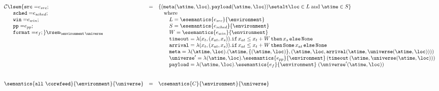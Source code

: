 
\newcommand{\rb}[1]{\raisebox{6ex}[0pt]{#1}}

\begin{figure*}[t]
\[
\begin{array}{lcl}

    {\cal C}\lsem\mathtt{\{ src=} e_{src}; 
 &=& \{( \mathtt{meta} (\atime,\loc), \mathtt{payload} (\atime,\loc))
          \setalt \loc \in  L
          \;\mbox{and}\; \atime \in S
     \}
\\
 \quad\ \   \mathtt{sched=} e_{sched};
&&\quad\mbox{where} \\
 \quad\ \  \mathtt{win=} e_{win};
&& \qquad L = \esemantics{e_{src}}{\environment}\\
 \quad\ \  \mathtt{pp=} e_{pp};
&& \qquad S = \esemantics{e_{sched}}{\environment} \\
 \quad\ \  \mathtt{format=} e_{f}; \}\rsem_{{\environment} \,
   {\universe}}
&& \qquad W = \esemantics{e_{win}}{\environment}\\
&& \qquad \mathtt{timeout} =  
     \lambda (x_t,(x_{at},x_s)).
        \mathtt{if}\, x_{at} \leq x_t + W \,
        \mathtt{then}\,  x_s \, \mathtt{else} \, \mathtt{None} 
\\
&& 
\qquad \mathtt{arrival} =  
     \lambda (x_t,(x_{at},x_s)).
        \mathtt{if}\, x_{at} \leq x_t + W \,
        \mathtt{then}\,  \mathtt{Some}\, x_{at} \, \mathtt{else} \, \mathtt{None} 
 \\
&& 
\qquad \mathtt{meta} =  
      \lambda (\atime,\loc).
       (\atime,\{(\atime,\loc)\}, (\atime,\loc,\mathtt{arrival}(\atime,\universe(\atime,\loc))))
\\
&& \qquad \universe' =
     \lambda (\atime, \loc). 
           \esemantics{e_{pp}}{\environment}\, 
                 (\mathtt{timeout}\, (\atime,\universe (\atime,\loc))) 
 \\
 && \qquad \mathtt{payload} =
      \lambda (\atime, \loc).
             \esemantics{e_f}{\environment}\; (\universe'(\atime, \loc))

\\



\\\\

\semantics{\mathtt{all}\ \corefeed}{\environment}{\universe} 
&=& 
\csemantics{C}{\environment}{\universe}
\\\\



\end{array}\]
\end{figure*}
